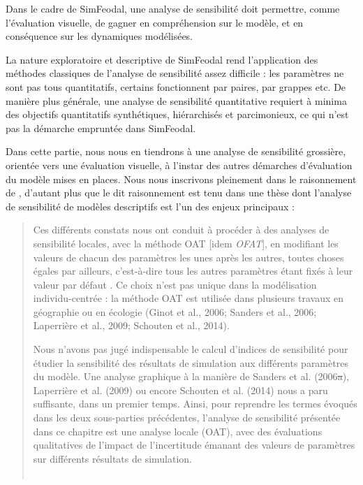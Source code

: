 Dans le cadre de SimFeodal, une analyse de sensibilité doit permettre, comme l'évaluation visuelle, de gagner en compréhension sur le modèle, et en conséquence sur les dynamiques modélisées.

La nature exploratoire et descriptive de SimFeodal rend l'application des méthodes classiques de l'analyse de sensibilité assez difficile : les paramètres ne sont pas tous quantitatifs, certains fonctionnent par paires, par grappes etc.
De manière plus générale, une analyse de sensibilité quantitative requiert à minima des objectifs quantitatifs synthétiques, hiérarchisés et parcimonieux, ce qui n'est pas la démarche empruntée dans SimFeodal.

Dans cette partie, nous nous en tiendrons à une analyse de sensibilité grossière, orientée vers une évaluation visuelle, à l'instar des autres démarches d'évaluation du modèle mises en places.
Nous nous inscrivons pleinement dans le raisonnement de , d'autant plus que le dit raisonnement est tenu dans une thèse dont l'analyse de sensibilité de modèles descriptifs est l'un des enjeux principaux :
\begin{quotation}
	\og Ces différents constats nous ont conduit à procéder à des analyses de sensibilité locales, avec la méthode OAT [idem \textit{OFAT}], en modifiant les valeurs de chacun des paramètres les unes après les autres, toutes choses égales par ailleurs, c’est-à-dire tous les autres paramètres étant fixés à leur valeur par défaut \textelp{}.
	Ce choix n’est pas unique dans la modélisation individu-centrée : la méthode OAT est utilisée dans plusieurs travaux en géographie ou en écologie (Ginot et al., 2006; Sanders et al., 2006; Laperrière et al., 2009; Schouten et al., 2014).
	
	Nous n’avons pas jugé indispensable le calcul d’indices de sensibilité pour étudier la sensibilité des résultats de simulation aux différents paramètres du modèle.
	Une analyse graphique à la manière de Sanders et al. (2006\st{a}), Laperrière et al. (2009) ou encore Schouten et al. (2014) nous a paru suffisante, dans un premier temps.
	Ainsi, pour reprendre les termes évoqués dans les deux sous-parties précédentes, l’analyse de sensibilité présentée dans ce chapitre est une analyse locale (OAT), avec des évaluations qualitatives de l’impact de l’incertitude émanant des valeurs de paramètres sur différents résultats de simulation.\fg{}\\
	\mbox{}~ \hfill \cite[251-252]{hirtzel2015exploration}
\end{quotation}


